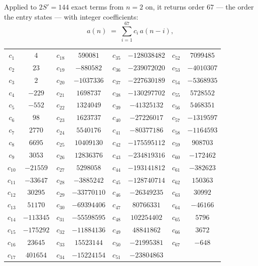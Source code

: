 \documentclass[11pt,a4paper]{article}
\theoremstyle{plain}
\theoremstyle{definition}
\begin{document}
Applied to $2S'=144$ exact terms from $n=2$ on, it returns order $67$ --- the
order the entry states --- with integer coefficients:
\[
a(n)\;=\;\sum_{i=1}^{67}c_i\,a(n-i),
\]
\begin{center}\small
\begin{tabular}{cccccccc}
$c_{1}$ & $4$ & $c_{18}$ & $590081$ & $c_{35}$ & $-128038482$ & $c_{52}$ & $7099485$ \\
$c_{2}$ & $23$ & $c_{19}$ & $-880582$ & $c_{36}$ & $-239072020$ & $c_{53}$ & $-4010307$ \\
$c_{3}$ & $2$ & $c_{20}$ & $-1037336$ & $c_{37}$ & $-227630189$ & $c_{54}$ & $-5368935$ \\
$c_{4}$ & $-229$ & $c_{21}$ & $1698737$ & $c_{38}$ & $-130297702$ & $c_{55}$ & $5728552$ \\
$c_{5}$ & $-552$ & $c_{22}$ & $1324049$ & $c_{39}$ & $-41325132$ & $c_{56}$ & $5468351$ \\
$c_{6}$ & $98$ & $c_{23}$ & $1623737$ & $c_{40}$ & $-27226017$ & $c_{57}$ & $-1319597$ \\
$c_{7}$ & $2770$ & $c_{24}$ & $5540176$ & $c_{41}$ & $-80377186$ & $c_{58}$ & $-1164593$ \\
$c_{8}$ & $6695$ & $c_{25}$ & $10409130$ & $c_{42}$ & $-175595112$ & $c_{59}$ & $908703$ \\
$c_{9}$ & $3053$ & $c_{26}$ & $12836376$ & $c_{43}$ & $-234819316$ & $c_{60}$ & $-172462$ \\
$c_{10}$ & $-21559$ & $c_{27}$ & $5298058$ & $c_{44}$ & $-193141812$ & $c_{61}$ & $-382623$ \\
$c_{11}$ & $-33647$ & $c_{28}$ & $-3885242$ & $c_{45}$ & $-128740714$ & $c_{62}$ & $150363$ \\
$c_{12}$ & $30295$ & $c_{29}$ & $-33770110$ & $c_{46}$ & $-26349235$ & $c_{63}$ & $30992$ \\
$c_{13}$ & $51170$ & $c_{30}$ & $-69394406$ & $c_{47}$ & $80766331$ & $c_{64}$ & $-46166$ \\
$c_{14}$ & $-113345$ & $c_{31}$ & $-55598595$ & $c_{48}$ & $102254402$ & $c_{65}$ & $5796$ \\
$c_{15}$ & $-175292$ & $c_{32}$ & $-11884136$ & $c_{49}$ & $48841862$ & $c_{66}$ & $3672$ \\
$c_{16}$ & $23645$ & $c_{33}$ & $15523144$ & $c_{50}$ & $-21995381$ & $c_{67}$ & $-648$ \\
$c_{17}$ & $401654$ & $c_{34}$ & $-15224154$ & $c_{51}$ & $-23804863$ &  &  \\
\end{tabular}
\end{center}
\end{document}
